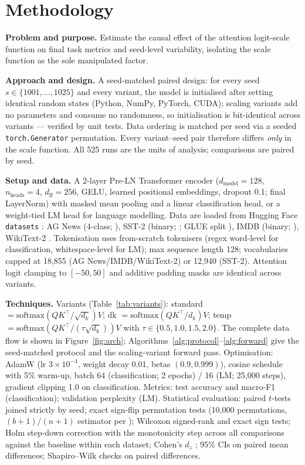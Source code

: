 \documentclass[11pt,a4paper]{article}
\begin{document}
\section{Methodology}

\textbf{Problem and purpose.} Estimate the causal effect of the attention logit-scale function on final task metrics and seed-level variability, isolating the scale function as the sole manipulated factor.

\textbf{Approach and design.} A seed-matched paired design: for every seed $s \in \{1001,\dots,1025\}$ and every variant, the model is initialised after setting identical random states (Python, NumPy, PyTorch, CUDA); scaling variants add no parameters and consume no randomness, so initialisation is bit-identical across variants --- verified by unit tests. Data ordering is matched per seed via a seeded \texttt{torch.Generator} permutation. Every variant--seed pair therefore differs \emph{only} in the scale function. All 525 runs are the units of analysis; comparisons are paired by seed.

\textbf{Setup and data.} A 2-layer Pre-LN Transformer encoder ($d_{\text{model}}{=}128$, $n_{\text{heads}}{=}4$, $d_{\text{ff}}{=}256$, GELU, learned positional embeddings, dropout 0.1; final LayerNorm) with masked mean pooling and a linear classification head, or a weight-tied LM head for language modelling. Data are loaded from Hugging Face \texttt{datasets} \cite{lhoest2021}: AG News (4-class; \cite{zhang2015}), SST-2 (binary; \cite{socher2013}; GLUE split \cite{wang2018}), IMDB (binary; \cite{maas2011}), WikiText-2 \cite{merity2017}. Tokenisation uses from-scratch tokenisers (regex word-level for classification, whitespace-level for LM); max sequence length 128; vocabularies capped at 18{,}855 (AG News/IMDB/WikiText-2) or 12{,}940 (SST-2). Attention logit clamping to $[-50,50]$ and additive padding masks are identical across variants.

\textbf{Techniques.} Variants (Table~\ref{tab:variants}): standard $=\mathrm{softmax}(QK^{\top}/\sqrt{d_k})V$; dk $=\mathrm{softmax}(QK^{\top}/d_k)V$; temp $=\mathrm{softmax}(QK^{\top}/(\tau\sqrt{d_k}))V$ with $\tau \in \{0.5, 1.0, 1.5, 2.0\}$. The complete data flow is shown in Figure~\ref{fig:arch}; Algorithms~\ref{alg:protocol}--\ref{alg:forward} give the seed-matched protocol and the scaling-variant forward pass. Optimisation: AdamW (lr $3\times10^{-4}$, weight decay 0.01, betas $(0.9,0.999)$), cosine schedule with 5\% warm-up, batch 64 (classification; 2 epochs) / 16 (LM; 25{,}000 steps), gradient clipping 1.0 on classification. Metrics: test accuracy and macro-F1 (classification); validation perplexity (LM). Statistical evaluation: paired $t$-tests joined strictly by seed; exact sign-flip permutation tests (10{,}000 permutations, $(b{+}1)/(n{+}1)$ estimator per \cite{phipson2010}); Wilcoxon signed-rank \cite{wilcoxon1945} and exact sign tests; Holm step-down correction with the monotonicity step \cite{holm1979} across all comparisons against the baseline within each dataset; Cohen's $d_z$ \cite{cohen1988}; 95\% CIs on paired mean differences; Shapiro--Wilk checks on paired differences.
\end{document}
